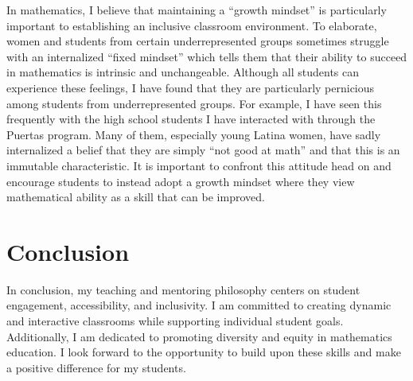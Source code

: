 \documentclass{article}
\begin{document}
In mathematics, I believe that maintaining a ``growth mindset'' is particularly important to establishing an inclusive classroom environment. To elaborate, women and students from certain underrepresented groups sometimes struggle with an internalized ``fixed mindset'' which tells them that their ability to succeed in mathematics is intrinsic and unchangeable. Although all students can experience these feelings, I have found that they are particularly pernicious among students from underrepresented groups. For example, I have seen this frequently with the high school students I have interacted with through the Puertas program. Many of them, especially young Latina women, have sadly internalized a belief that they are simply ``not good at math'' and that this is an immutable characteristic. It is important to confront this attitude head on and encourage students to instead adopt a growth mindset where they view mathematical ability as a skill that can be improved.

\section*{Conclusion}

In conclusion, my teaching and mentoring philosophy centers on student engagement, accessibility, and inclusivity. I am committed to creating dynamic and interactive classrooms while supporting individual student goals. Additionally, I am dedicated to promoting diversity and equity in mathematics education. I look forward to the opportunity to build upon these skills and make a positive difference for my students.
\end{document}
